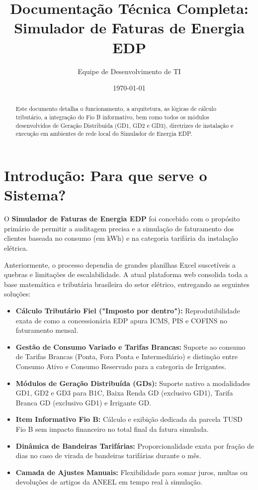 \documentclass[12pt,a4paper]{article}
\title{Documentação Técnica Completa: Simulador de Faturas de Energia EDP}
\author{Equipe de Desenvolvimento de TI}
\date{\today}
\begin{document}
\maketitle

\begin{abstract}
Este documento detalha o funcionamento, a arquitetura, as lógicas de cálculo tributário, a integração do Fio B informativo, bem como todos os módulos desenvolvidos de Geração Distribuída (GD1, GD2 e GD3), diretrizes de instalação e execução em ambientes de rede local do Simulador de Energia EDP.
\end{abstract}

\tableofcontents
\newpage

\section{Introdução: Para que serve o Sistema?}
O \textbf{Simulador de Faturas de Energia EDP} foi concebido com o propósito primário de permitir a auditagem precisa e a simulação de faturamento dos clientes baseada no consumo (em kWh) e na categoria tarifária da instalação elétrica. 

Anteriormente, o processo dependia de grandes planilhas Excel suscetíveis a quebras e limitações de escalabilidade. A atual plataforma web consolida toda a base matemática e tributária brasileira do setor elétrico, entregando as seguintes soluções:
\begin{itemize}
    \item \textbf{Cálculo Tributário Fiel ("Imposto por dentro"):} Reprodutibilidade exata de como a concessionária EDP apura ICMS, PIS e COFINS no faturamento mensal.
    \item \textbf{Gestão de Consumo Variado e Tarifas Brancas:} Suporte ao consumo de Tarifas Brancas (Ponta, Fora Ponta e Intermediário) e distinção entre Consumo Ativo e Consumo Reservado para a categoria de Irrigantes.
    \item \textbf{Módulos de Geração Distribuída (GDs):} Suporte nativo a modalidades GD1, GD2 e GD3 para B1C, Baixa Renda GD (exclusivo GD1), Tarifa Branca GD (exclusivo GD1) e Irrigante GD.
    \item \textbf{Item Informativo Fio B:} Cálculo e exibição dedicada da parcela TUSD Fio B sem impacto financeiro no total final da fatura simulada.
    \item \textbf{Dinâmica de Bandeiras Tarifárias:} Proporcionalidade exata por fração de dias no caso de virada de bandeiras tarifárias durante o mês.
    \item \textbf{Camada de Ajustes Manuais:} Flexibilidade para somar juros, multas ou devoluções de artigos da ANEEL em tempo real à simulação.
\end{itemize}
\end{document}
